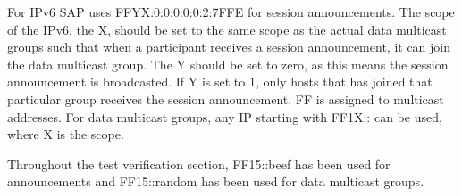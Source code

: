 \noindent{}For IPv6 SAP uses FFYX:0:0:0:0:0:2:7FFE for session announcements. The scope of the IPv6, the X, should be set to the same scope as the actual data multicast groups such that when a participant receives a session announcement, it can join the data multicast group. The Y should be set to zero, as this means the session announcement is broadcasted. If Y is set to 1, only hosts that has joined that particular group receives the session announcement. FF is assigned to multicast addresses. For data multicast groups, any IP starting with FF1X:: can be used, where X is the scope.

\noindent{}Throughout the test verification section, FF15::beef has been used for announcements and FF15::random has been used for data multicast groups.



%





%

